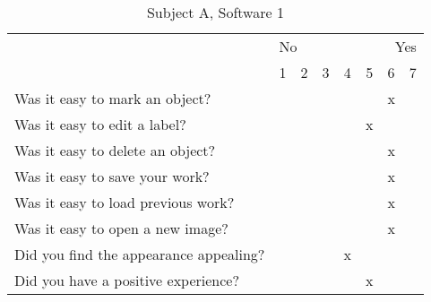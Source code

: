 \documentclass[a4paper,11pt,oneside]{article}
\begin{document}
\begin{table}[h!]

\centering
\caption{Subject A, Software 1}

\vspace{10px}
\begin{tabular}{ p{7cm} | c | c | c | c | c | c | c | }
    \cline{2-8}
     & \multicolumn{3}{|l}{No} & \multicolumn{1}{c}{ } & \multicolumn{3}{r|}{Yes} \\
    \cline{2-8}
      & 1 & 2 & 3 & 4 & 5 & 6 & 7 \\
    \hline
    \multicolumn{1}{|l|}{Was it easy to mark an object?} & & & & & & x & \\
    \hline
    \multicolumn{1}{|l|}{Was it easy to edit a label?} & & & & & x & & \\
    \hline
    \multicolumn{1}{|l|}{Was it easy to delete an object?} & & & & & & x & \\
    \hline
    \multicolumn{1}{|l|}{Was it easy to save your work?} & & & & & & x & \\
    \hline
    \multicolumn{1}{|l|}{Was it easy to load previous work?} & & & & & & x & \\
    \hline
    \multicolumn{1}{|l|}{Was it easy to open a new image?} & & & & & & x & \\
    \hline
    \multicolumn{1}{|l|}{Did you find the appearance appealing?} & & & & x & & & \\
    \hline
    \multicolumn{1}{|l|}{Did you have a positive experience?} & & & & & x & & \\
    \hline
\end{tabular} 
\label{tab:a1}
\end{table}
\end{document}
